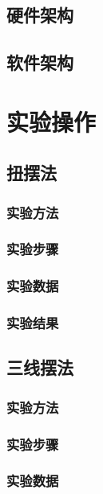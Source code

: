 \documentclass[12pt,hyperref,a4paper,UTF8]{ctexart}
\begin{document}
\subsection{硬件架构}


\subsection{软件架构}



\section{实验操作}
\subsection{扭摆法}
\subsubsection{实验方法}

\subsubsection{实验步骤}

\subsubsection{实验数据}

\subsubsection{实验结果}


\subsection{三线摆法}
\subsubsection{实验方法}

\subsubsection{实验步骤}

\subsubsection{实验数据}
\end{document}

